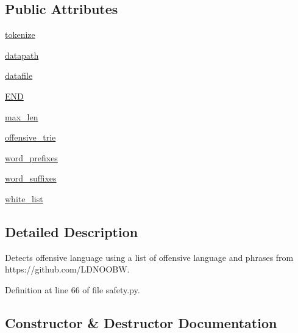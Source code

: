 \subsection*{Public Attributes}
\begin{DoxyCompactItemize}
\item 
\hyperlink{classparlai_1_1utils_1_1safety_1_1OffensiveStringMatcher_a6c9ecda500832f159ede21f3a73ee56b}{tokenize}
\item 
\hyperlink{classparlai_1_1utils_1_1safety_1_1OffensiveStringMatcher_a8c7a5276c0d2ed281a19bbcbcee3b8af}{datapath}
\item 
\hyperlink{classparlai_1_1utils_1_1safety_1_1OffensiveStringMatcher_a47317e09499753db2a16fc36fd39de90}{datafile}
\item 
\hyperlink{classparlai_1_1utils_1_1safety_1_1OffensiveStringMatcher_a50a8ff283ddb837060366bba52d8136c}{E\+ND}
\item 
\hyperlink{classparlai_1_1utils_1_1safety_1_1OffensiveStringMatcher_a3be92b9eb75dc4e4939010af668e724f}{max\+\_\+len}
\item 
\hyperlink{classparlai_1_1utils_1_1safety_1_1OffensiveStringMatcher_a4fe018f2abe2a73114d783645c006c1b}{offensive\+\_\+trie}
\item 
\hyperlink{classparlai_1_1utils_1_1safety_1_1OffensiveStringMatcher_aa880cf00a0354c45f576c3d933a1435e}{word\+\_\+prefixes}
\item 
\hyperlink{classparlai_1_1utils_1_1safety_1_1OffensiveStringMatcher_af474171a03d288a3d8adaa2287eedc8c}{word\+\_\+suffixes}
\item 
\hyperlink{classparlai_1_1utils_1_1safety_1_1OffensiveStringMatcher_a65169673f0ff35c5e1f0258585540389}{white\+\_\+list}
\end{DoxyCompactItemize}


\subsection{Detailed Description}
\begin{DoxyVerb}Detects offensive language using a list of offensive language and phrases from
https://github.com/LDNOOBW.
\end{DoxyVerb}
 

Definition at line 66 of file safety.\+py.



\subsection{Constructor \& Destructor Documentation}
\mbox{\label{classparlai_1_1utils_1_1safety_1_1OffensiveStringMatcher_a9e850e121799468d26c5720be21bf72c}} 
